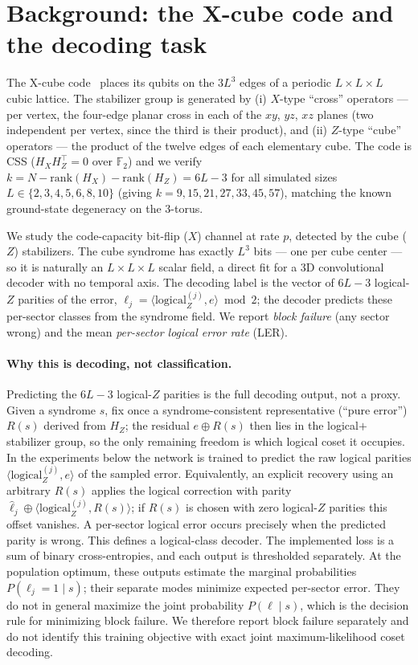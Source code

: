 \documentclass[11pt,a4paper]{article}
\begin{document}
\section{Background: the X-cube code and the decoding task}
\label{sec:background}
The X-cube code~\cite{vijay2016} places its qubits on the $3L^3$ edges of a
periodic $L \times L \times L$ cubic lattice. The stabilizer group is generated
by (i) $X$-type ``cross'' operators --- per vertex, the four-edge planar cross
in each of the $xy$, $yz$, $xz$ planes (two independent per vertex, since the
third is their product), and (ii) $Z$-type ``cube'' operators --- the product of
the twelve edges of each elementary cube. The code is CSS
($H_X H_Z^\top = 0$ over $\mathbb{F}_2$) and we verify
$k = N - \mathrm{rank}(H_X) - \mathrm{rank}(H_Z) = 6L - 3$ for all
simulated sizes $L \in \{2,3,4,5,6,8,10\}$ (giving
$k = 9, 15, 21, 27, 33, 45, 57$), matching the known ground-state
degeneracy on the 3-torus.

We study the code-capacity bit-flip ($X$) channel at rate $p$, detected by
the cube ($Z$) stabilizers. The cube syndrome has exactly $L^3$ bits --- one
per cube center --- so it is naturally an $L \times L \times L$ scalar field,
a direct fit for a 3D convolutional decoder with no temporal axis. The
decoding label is the vector of $6L-3$ logical-$Z$ parities of the error,
$\ell_j = \langle \mathrm{logical}_Z^{(j)}, e \rangle \bmod 2$; the decoder
predicts these per-sector classes from the syndrome field. We report
\emph{block failure} (any sector wrong) and the mean \emph{per-sector
logical error rate} (LER).

\paragraph{Why this is decoding, not classification.} Predicting the $6L-3$
logical-$Z$ parities is the full decoding output, not a proxy. Given a syndrome
$s$, fix once a syndrome-consistent representative (``pure error'') $R(s)$
derived from $H_Z$; the residual $e \oplus R(s)$ then lies in the
logical$+$stabilizer group, so the only remaining freedom is which logical coset
it occupies. In the experiments below the network is trained to predict the raw
logical parities $\langle \mathrm{logical}_Z^{(j)}, e\rangle$ of the sampled
error. Equivalently, an explicit recovery using an arbitrary $R(s)$ applies the
logical correction with parity
$\hat\ell_j \oplus \langle \mathrm{logical}_Z^{(j)}, R(s)\rangle$; if $R(s)$ is
chosen with zero logical-$Z$ parities this offset vanishes. A per-sector logical
error occurs precisely when the predicted parity is wrong. This defines a logical-class decoder. The implemented loss is a sum
of binary cross-entropies, and each output is thresholded separately.
At the population optimum, these outputs estimate the marginal probabilities
$P(\ell_j=1\mid s)$; their separate modes minimize expected per-sector
error. They do not in general maximize the joint probability $P(\ell\mid s)$,
which is the decision rule for minimizing block failure. We therefore
report block failure separately and do not identify this training objective
with exact joint maximum-likelihood coset decoding.
\end{document}
